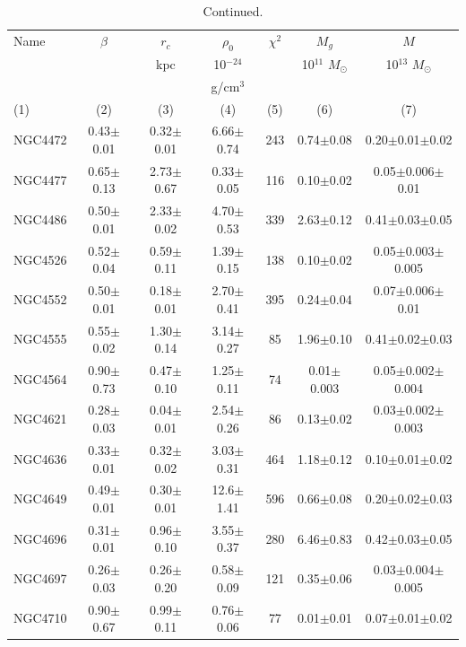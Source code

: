 \documentclass[iop]{emulateapj}
\begin{document}
\setcounter{table}{2}
\begin{table}
\centering
\caption{Continued.}
\begin{tabular}{lcccccc}
\hline
Name   & $\beta$       & $r_c$         & $\rho_0$   & $\chi^2$ &  $M_{g}$              & $M$                    \\
       &               & kpc           & 10$^{-24}$ &          &  10$^{11}$ $M_{\odot}$ & 10$^{13}$ $M_{\odot}$  \\
       &               &               & g/cm$^3$   &          &                       &                        \\
  (1)  &         (2)   &  (3)          &  (4)       & (5)      &   (6)                 & (7)                   \\
\hline
NGC4472 & 0.43$\pm$0.01 & 0.32$\pm$0.01 & 6.66$\pm$0.74 & 243 & 0.74$\pm$0.08 & 0.20$\pm$0.01$\pm$0.02  \\
NGC4477 & 0.65$\pm$0.13 & 2.73$\pm$0.67 & 0.33$\pm$0.05 & 116 & 0.10$\pm$0.02 & 0.05$\pm$0.006$\pm$0.01 \\
NGC4486 & 0.50$\pm$0.01 & 2.33$\pm$0.02 & 4.70$\pm$0.53 &  339 & 2.63$\pm$0.12 & 0.41$\pm$0.03$\pm$0.05 \\
NGC4526 & 0.52$\pm$0.04 & 0.59$\pm$0.11  & 1.39$\pm$0.15 & 138 & 0.10$\pm$0.02 & 0.05$\pm$0.003$\pm$0.005   \\
NGC4552 & 0.50$\pm$0.01 & 0.18$\pm$0.01  & 2.70$\pm$0.41 & 395 & 0.24$\pm$0.04 & 0.07$\pm$0.006$\pm$0.01   \\
NGC4555 & 0.55$\pm$0.02 & 1.30$\pm$0.14  & 3.14$\pm$0.27  & 85 & 1.96$\pm$0.10  & 0.41$\pm$0.02$\pm$0.03   \\
NGC4564 & 0.90$\pm$0.73 & 0.47$\pm$0.10 & 1.25$\pm$0.11 & 74 & 0.01$\pm$0.003 & 0.05$\pm$0.002$\pm$0.004    \\
NGC4621 & 0.28$\pm$0.03 & 0.04$\pm$0.01 & 2.54$\pm$0.26 & 86 & 0.13$\pm$0.02 & 0.03$\pm$0.002$\pm$0.003   \\
NGC4636 & 0.33$\pm$0.01 & 0.32$\pm$0.02 & 3.03$\pm$0.31 & 464  & 1.18$\pm$0.12 & 0.10$\pm$0.01$\pm$0.02   \\
NGC4649 & 0.49$\pm$0.01 & 0.30$\pm$0.01 & 12.6$\pm$1.41 & 596 & 0.66$\pm$0.08 & 0.20$\pm$0.02$\pm$0.03    \\
NGC4696 & 0.31$\pm$0.01 & 0.96$\pm$0.10 & 3.55$\pm$0.37 & 280 & 6.46$\pm$0.83 & 0.42$\pm$0.03$\pm$0.05  \\
NGC4697 & 0.26$\pm$0.03 & 0.26$\pm$0.20 & 0.58$\pm$0.09 & 121 & 0.35$\pm$0.06 & 0.03$\pm$0.004$\pm$0.005   \\
NGC4710 & 0.90$\pm$0.67 & 0.99$\pm$0.11 & 0.76$\pm$0.06 & 77 & 0.01$\pm$0.01 & 0.07$\pm$0.01$\pm$0.02 \\

\end{tabular}
\end{table}
\end{document}
